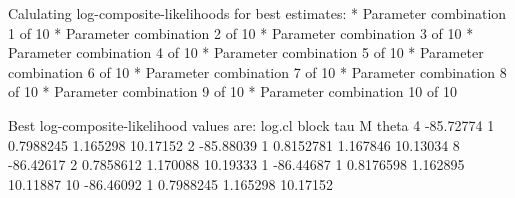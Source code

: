 \begin{Schunk}
\begin{Soutput}
Calulating log-composite-likelihoods for best estimates: 
* Parameter combination 1 of 10 
* Parameter combination 2 of 10 
* Parameter combination 3 of 10 
* Parameter combination 4 of 10 
* Parameter combination 5 of 10 
* Parameter combination 6 of 10 
* Parameter combination 7 of 10 
* Parameter combination 8 of 10 
* Parameter combination 9 of 10 
* Parameter combination 10 of 10 


Best log-composite-likelihood values are: 
      log.cl block       tau        M    theta
4  -85.72774     1 0.7988245 1.165298 10.17152
2  -85.88039     1 0.8152781 1.167846 10.13034
8  -86.42617     2 0.7858612 1.170088 10.19333
1  -86.44687     1 0.8176598 1.162895 10.11887
10 -86.46092     1 0.7988245 1.165298 10.17152
\end{Soutput}
\end{Schunk}

